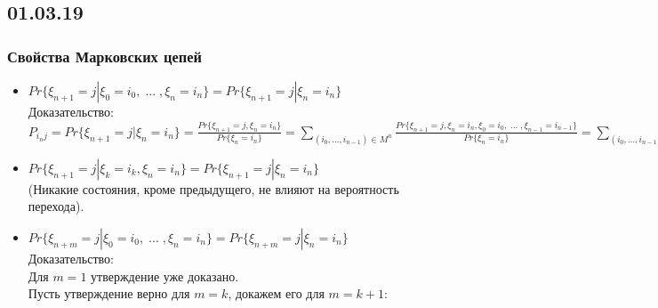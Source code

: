 \subsection{01.03.19}
\subsubsection{Свойства Марковских цепей}
\begin{itemize}
\item $Pr\{\xi_{n + 1} = j | \xi_0 = i_0, \; ... \; , \xi_n = i_n\} = Pr\{\xi_{n + 1} = j | \xi_n = i_n\}$\\
Доказательство:\\
$P_{i_nj} = Pr\{\xi_{n + 1} = j | \xi_n = i_n\} = \frac{Pr\{\xi_{n + 1} = j, \xi_n = i_n\}}{Pr\{\xi_n = i_n\}} = \sum\limits_{(i_0, ..., i_{n-1}) \in M^n} \frac{Pr\{\xi_{n + 1} = j, \xi_n = i_n, \xi_0 = i_0, \; ... \; , \xi_{n-1} = i_{n-1}\}}{Pr\{\xi_n = i_n\}} = \sum\limits_{(i_0, ..., i_{n-1}) \in M^n} \frac{P_{i_nj}Pr\{\xi_n = i, \xi_0 = i_0, \; ... \; , \xi_{n - 1} = i_{n - 1}\}}{Pr\{\xi_n = i_n\}} = \frac{P_{i_nj}}{Pr\{\xi_n = i_n\}} * \sum\limits_{(i_0, ..., i_{n-1}) \in M^n}Pr\{\xi_n = i_n, \xi_0 = i_0, \; ... \; , \xi_{n - 1} = i_{n - 1}\} = \frac{P_{i_nj}}{Pr\{\xi_n = i_n\}} * Pr\{\xi_n = i_n\} = P_{i_nj}$\\
\item $Pr\{\xi_{n + 1} = j | \xi_k = i_k, \xi_n = i_n\} = Pr\{\xi_{n + 1} = j | \xi_n = i_n\}$\\
(Никакие состояния, кроме предыдущего, не влияют на вероятность перехода).\\
\item $Pr\{\xi_{n + m} = j | \xi_0 = i_0, \; ... \; , \xi_n = i_n\} = Pr\{\xi_{n + m} = j | \xi_n = i_n\}$\\
Доказательство:\\
Для $m = 1$ утверждение уже доказано.\\
Пусть утверждение верно для $m = k$, докажем его для $m = k + 1$:\\

\end{itemize}
